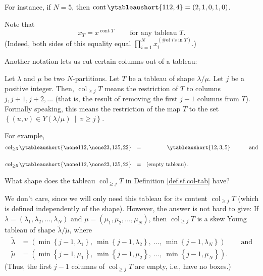 For instance, if $N=5$, then $\operatorname*{cont}%
\ytableaushort{112,4}=\left(  2,1,0,1,0\right)  $.

Note that%
\begin{equation}
x_{T}=x^{\operatorname*{cont}T}\ \ \ \ \ \ \ \ \ \ \text{for any tableau }T.
\label{eq.def.sf.content.xT=}%
\end{equation}
(Indeed, both sides of this equality equal $\prod_{i=1}^{N}x_{i}^{\left(
\text{\# of }i\text{'s in }T\right)  }$.)

Another notation lets us cut certain columns out of a tableau:

\begin{definition}
\label{def.sf.col-tab}Let $\lambda$ and $\mu$ be two $N$-partitions. Let $T$
be a tableau of shape $\lambda/\mu$. Let $j$ be a positive integer. Then,
$\operatorname{col}_{\geq j}T$ means the restriction of $T$ to columns
$j,j+1,j+2,\ldots$ (that is, the result of removing the first $j-1$ columns
from $T$). Formally speaking, this means the restriction of the map $T$ to the
set $\left\{  \left(  u,v\right)  \in Y\left(  \lambda/\mu\right)
\ \mid\ v\geq j\right\}  $.
\end{definition}

For example,%
\begin{align*}
\operatorname{col}_{\geq3}\ytableaushort{\none 112,\none 23,135,22}\ \  &
=\ \ \ \ \ \ \ \ \ \ \ \ \ \ytableaushort{12,3,5}\ \ \ \ \ \ \ \ \ \ \text{and}%
\\
& \\
\operatorname{col}_{\geq5}\ytableaushort{\none 112,\none 23,135,22}\ \  &
=\ \ \left(  \text{empty tableau}\right)  .
\end{align*}


\begin{remark}
What shape does the tableau $\operatorname{col}_{\geq j}T$ in Definition
\ref{def.sf.col-tab} have?

We don't care, since we will only need this tableau for its content
$\operatorname{col}_{\geq j}T$ (which is defined independently of the shape).
However, the answer is not hard to give: If $\lambda=\left(  \lambda
_{1},\lambda_{2},\ldots,\lambda_{N}\right)  $ and $\mu=\left(  \mu_{1},\mu
_{2},\ldots,\mu_{N}\right)  $, then $\operatorname{col}_{\geq j}T$ is a skew
Young tableau of shape $\widetilde{\lambda}/\widetilde{\mu}$, where%
\begin{align*}
\widetilde{\lambda}  &  =\left(  \min\left\{  j-1,\lambda_{1}\right\}
,\ \min\left\{  j-1,\lambda_{2}\right\}  ,\ \ldots,\ \min\left\{
j-1,\lambda_{N}\right\}  \right)  \ \ \ \ \ \ \ \ \ \ \text{and}\\
\widetilde{\mu}  &  =\left(  \min\left\{  j-1,\mu_{1}\right\}  ,\ \min\left\{
j-1,\mu_{2}\right\}  ,\ \ldots,\ \min\left\{  j-1,\mu_{N}\right\}  \right)  .
\end{align*}
(Thus, the first $j-1$ columns of $\operatorname{col}_{\geq j}T$ are empty,
i.e., have no boxes.)
\end{remark}

